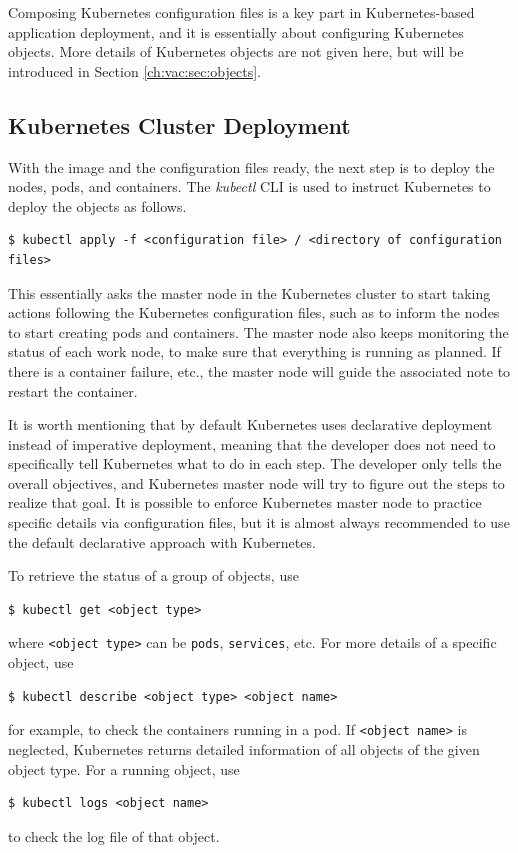Composing Kubernetes configuration files is a key part in Kubernetes-based application deployment, and it is essentially about configuring Kubernetes objects. More details of Kubernetes objects are not given here, but will be introduced in Section \ref{ch:vac:sec:objects}.

\subsection{Kubernetes Cluster Deployment}

With the image and the configuration files ready, the next step is to deploy the nodes, pods, and containers. The \textit{kubectl} CLI is used to instruct Kubernetes to deploy the objects as follows.
\begin{lstlisting}
$ kubectl apply -f <configuration file> / <directory of configuration files>
\end{lstlisting}
This essentially asks the master node in the Kubernetes cluster to start taking actions following the Kubernetes configuration files, such as to inform the nodes to start creating pods and containers. The master node also keeps monitoring the status of each work node, to make sure that everything is running as planned. If there is a container failure, etc., the master node will guide the associated note to restart the container.

It is worth mentioning that by default Kubernetes uses declarative deployment instead of imperative deployment, meaning that the developer does not need to specifically tell Kubernetes what to do in each step. The developer only tells the overall objectives, and Kubernetes master node will try to figure out the steps to realize that goal. It is possible to enforce Kubernetes master node to practice specific details via configuration files, but it is almost always recommended to use the default declarative approach with Kubernetes.

To retrieve the status of a group of objects, use
\begin{lstlisting}
$ kubectl get <object type>
\end{lstlisting}
where \verb|<object type>| can be \verb|pods|, \verb|services|, etc. For more details of a specific object, use
\begin{lstlisting}
$ kubectl describe <object type> <object name>
\end{lstlisting}
for example, to check the containers running in a pod. If \verb|<object name>| is neglected, Kubernetes returns detailed information of all objects of the given object type. For a running object, use
\begin{lstlisting}
$ kubectl logs <object name>
\end{lstlisting}
to check the log file of that object.

